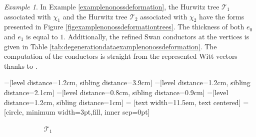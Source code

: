 \documentclass{compositio}
\theoremstyle{remark}
\newtheorem{example}[theorem]{Example}
\theoremstyle{remark}
\begin{document}
\begin{example}
\label{examplenonossdeformationHurwitz}
In Example \ref{examplenonossdeformation}, the Hurwitz tree $\mathcal{T}_1$ associated with $\chi_1$ and the Hurwitz tree $\mathcal{T}_2$ associated with $\chi_2$ have the forms presented in Figure \ref{figexamplenonossdeformationtrees}. The thickness of both $e_0$ and $e_1$ is equal to $1$. Additionally, the refined Swan conductors at the vertices is given in Table \ref{tab:degenerationdataexamplenonossdeformation}. The computation of the conductors is straight from the represented Witt vectors thanks to \cite[Proposition 2.8]{MR3726102}.

=[level distance=1.2cm, sibling distance=3.9cm]
=[level distance=1.2cm, sibling distance=2.1cm]
=[level distance=0.8cm, sibling distance=0.9cm]
=[level distance=1.2cm, sibling distance=1cm]
 = [text width=11.5em, text centered]
 = [circle, minimum width=3pt,fill, inner sep=0pt]
\begin{figure}[ht]
\begin{subfigure}{.5\textwidth}
  \centering
{}
  \caption{$\mathcal{T}_1$}
  \label{figexamplenonossdeformationtree1}
\end{subfigure}%
\begin{subfigure}{.5\textwidth}
  \centering
\begin{tikzpicture}[grow=up, sloped]

\end{tikzpicture}
\end{subfigure}
\end{figure}
\end{example}
\end{document}
